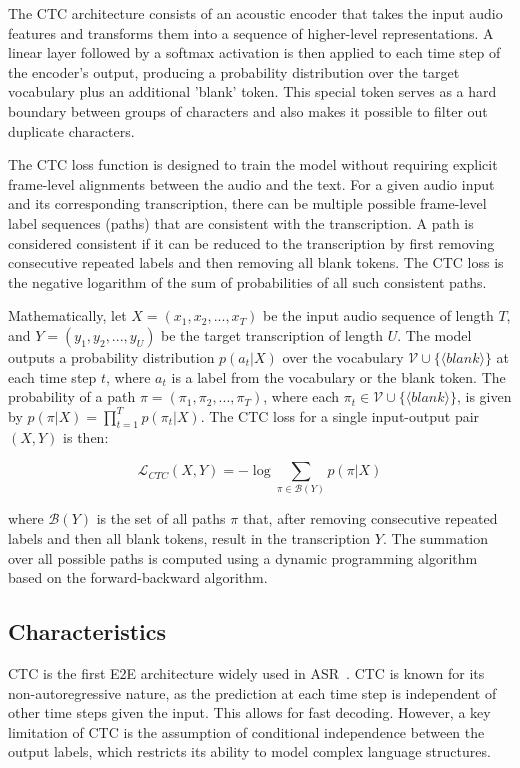 The CTC architecture consists of an acoustic encoder that takes the input audio features and transforms them into a sequence of higher-level representations. A linear layer followed by a softmax activation is then applied to each time step of the encoder's output, producing a probability distribution over the target vocabulary plus an additional 'blank' token. This special token serves as a hard boundary between groups of characters and also makes it possible to filter out duplicate characters.

The CTC loss function is designed to train the model without requiring explicit frame-level alignments between the audio and the text. For a given audio input and its corresponding transcription, there can be multiple possible frame-level label sequences (paths) that are consistent with the transcription. A path is considered consistent if it can be reduced to the transcription by first removing consecutive repeated labels and then removing all blank tokens. The CTC loss is the negative logarithm of the sum of probabilities of all such consistent paths.

Mathematically, let $X = (x_1, x_2, ..., x_T)$ be the input audio sequence of length $T$, and $Y = (y_1, y_2, ..., y_U)$ be the target transcription of length $U$. The model outputs a probability distribution $p(a_t | X)$ over the vocabulary $\mathcal{V} \cup \{\langle blank \rangle\}$ at each time step $t$, where $a_t$ is a label from the vocabulary or the blank token. The probability of a path $\pi = (\pi_1, \pi_2, ..., \pi_T)$, where each $\pi_t \in \mathcal{V} \cup \{\langle blank \rangle\}$, is given by $p(\pi | X) = \prod_{t=1}^{T} p(\pi_t | X)$. The CTC loss for a single input-output pair $(X, Y)$ is then:

\begin{equation}
\mathcal{L}_{CTC}(X, Y) = -\log \sum_{\pi \in \mathcal{B}(Y)} p(\pi | X)
\end{equation}

where $\mathcal{B}(Y)$ is the set of all paths $\pi$ that, after removing consecutive repeated labels and then all blank tokens, result in the transcription $Y$. The summation over all possible paths is computed using a dynamic programming algorithm based on the forward-backward algorithm.


\subsection{Characteristics}

CTC is the first E2E architecture widely used in ASR~\cite{hannun2014deep, Miao_2015, soltau2017neural, Das_2019}. CTC is known for its non-autoregressive nature, as the prediction at each time step is independent of other time steps given the input. This allows for fast decoding. However, a key limitation of CTC is the assumption of conditional independence between the output labels, which restricts its ability to model complex language structures.

